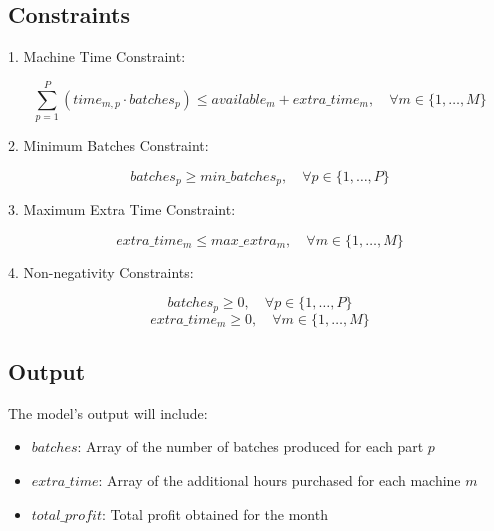 \documentclass{article}
\begin{document}
\subsection*{Constraints}
1. Machine Time Constraint:

\[
\sum_{p=1}^{P} (time_{m,p} \cdot batches_{p}) \leq available_{m} + extra\_time_{m}, \quad \forall m \in \{1, \ldots, M\}
\]

2. Minimum Batches Constraint:

\[
batches_{p} \geq min\_batches_{p}, \quad \forall p \in \{1, \ldots, P\}
\]

3. Maximum Extra Time Constraint:

\[
extra\_time_{m} \leq max\_extra_{m}, \quad \forall m \in \{1, \ldots, M\}
\]

4. Non-negativity Constraints:

\[
batches_{p} \geq 0, \quad \forall p \in \{1, \ldots, P\}
\]
\[
extra\_time_{m} \geq 0, \quad \forall m \in \{1, \ldots, M\}
\]

\subsection*{Output}
The model's output will include:
\begin{itemize}
    \item $batches$: Array of the number of batches produced for each part $p$
    \item $extra\_time$: Array of the additional hours purchased for each machine $m$
    \item $total\_profit$: Total profit obtained for the month
\end{itemize}
\end{document}

